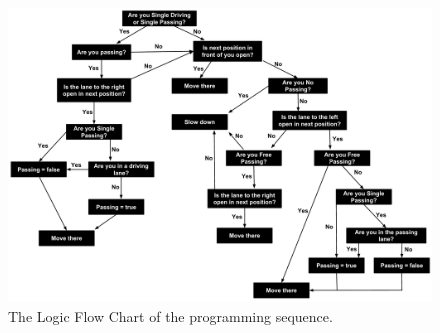\documentclass{amsart}
\begin{document}
\begin{figure}[h]
\centering
\includegraphics[scale=0.36]{MCM-LogicalFlowChartUpdated.pdf}
\caption{The Logic Flow Chart of the programming sequence.}
\label{MCM-LogicalFlowChart}	
\end{figure}
\end{document}
